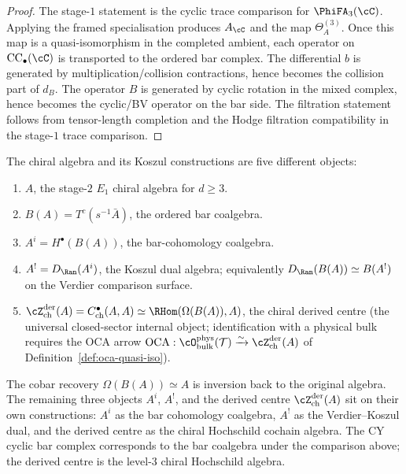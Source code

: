 \begin{proof}
The stage-$1$ statement is the cyclic trace comparison for
$\PhiFA_3(\cC)$. Applying the framed specialisation produces
$A_\cC$ and the map $\Theta_A^{(3)}$. Once this map is a
quasi-isomorphism in the completed ambient, each operator on
$\mathrm{CC}_\bullet(\cC)$ is transported to the ordered bar complex.
The differential $b$ is generated by multiplication/collision
contractions, hence becomes the collision part of $d_B$. The operator
$B$ is generated by cyclic rotation in the mixed complex, hence becomes
the cyclic/BV operator on the bar side. The filtration statement follows
from tensor-length completion and the Hodge filtration compatibility in
the stage-$1$ trace comparison.
\end{proof}

\begin{remark}
\label{rem:three-functors-cy}
The chiral algebra and its Koszul constructions are five different
objects:
\begin{enumerate}[label=(\arabic*)]
 \item $A$, the stage-$2$ $E_1$ chiral algebra for $d\geq3$.
 \item $B(A)=T^c(s^{-1}\bar A)$, the ordered bar coalgebra.
 \item $A^i=H^\bullet(B(A))$, the bar-cohomology coalgebra.
 \item $A^!=D_{\Ran}(A^i)$, the Koszul dual algebra; equivalently
 $D_{\Ran}(B(A))\simeq B(A^!)$ on the Verdier comparison surface.
 \item $\cZ^{\mathrm{der}}_{\mathrm{ch}}(A)=
 C^\bullet_{\mathrm{ch}}(A,A)\simeq\RHom(\Omega(B(A)),A)$, the chiral
 derived centre (the universal closed-sector internal object;
 identification with a physical bulk requires the OCA arrow
 $\mathrm{OCA}: \cO^{\mathrm{phys}}_{\mathrm{bulk}}(\mathcal T)
 \xrightarrow{\sim} \cZ^{\mathrm{der}}_{\mathrm{ch}}(A)$ of
 Definition~\ref{def:oca-quasi-iso}).
\end{enumerate}
The cobar recovery $\Omega(B(A)) \simeq A$ is inversion back to the
original algebra. The remaining three objects $A^i$, $A^!$, and the
derived centre $\cZ^{\mathrm{der}}_{\mathrm{ch}}(A)$ sit on their own
constructions: $A^i$ as the bar cohomology coalgebra, $A^!$ as the
Verdier--Koszul dual, and the derived centre as the chiral
Hochschild cochain algebra. The CY cyclic bar complex corresponds to
the bar coalgebra under the comparison above; the derived centre
is the level-$3$ chiral Hochschild algebra.
\end{remark}



